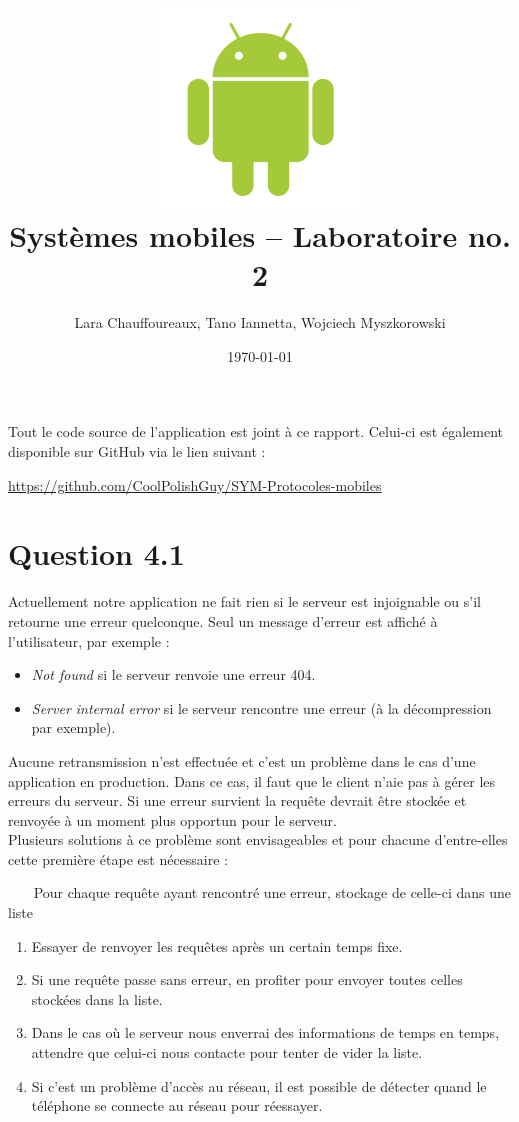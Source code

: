 \documentclass[12pt]{article}
\title{\includegraphics[width=200px]{title}\\
  \vspace{40 mm}
  \huge{Systèmes mobiles -- Laboratoire no. 2}
\vspace{20 mm}
}
\author{Lara Chauffoureaux, Tano Iannetta, Wojciech Myszkorowski}
\date{\today}
\begin{document}
\maketitle
\thispagestyle{empty}
\clearpage

Tout le code source de l'application est joint à ce rapport. Celui-ci est également disponible sur GitHub via le lien suivant : 

\url{https://github.com/CoolPolishGuy/SYM-Protocoles-mobiles}

\section*{Question 4.1}

Actuellement notre application ne fait rien si le serveur est injoignable ou s'il retourne une erreur quelconque. Seul un message d'erreur est affiché à l'utilisateur, par exemple : 

\begin{itemize}
\item \emph{Not found} si le serveur renvoie une erreur 404.
\item \emph{Server internal error} si le serveur rencontre une erreur (à la décompression par exemple).
\end{itemize}

Aucune retransmission n'est effectuée et c'est un problème dans le cas d'une application en production. Dans ce cas, il faut que le client n'aie pas à gérer les erreurs du serveur. Si une erreur survient la requête devrait être stockée et renvoyée à un moment plus opportun pour le serveur. \\

Plusieurs solutions à ce problème sont envisageables et pour chacune d'entre-elles cette première étape est nécessaire :

~~~ \textcolor{pred}{Pour chaque requête ayant rencontré une erreur, stockage de celle-ci dans une liste}

\begin{enumerate}
\item Essayer de renvoyer les requêtes après un certain temps fixe.
\item Si une requête passe sans erreur, en profiter pour envoyer toutes celles stockées dans la liste.
\item Dans le cas où le serveur nous enverrai des informations de temps en temps, attendre que celui-ci nous contacte pour tenter de vider la liste.
\item Si c'est un problème d'accès au réseau, il est possible de détecter quand le téléphone se connecte au réseau pour réessayer.
\end{enumerate}
\end{document}

